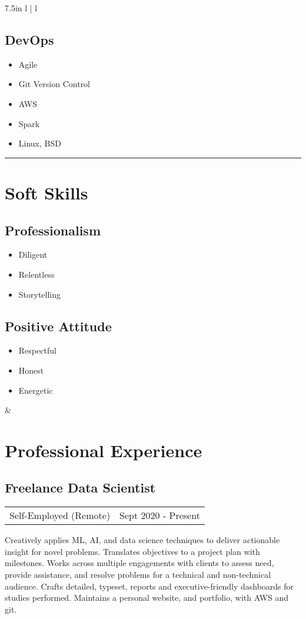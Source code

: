 \documentclass{article}
\begin{document}
\begin{tabular*}{7.5in}{ l | l}
\begin{minipage}[t]{2.0in}
	\subsection*{DevOps}
	\begin{itemize}[noitemsep]
		\item Agile
		\item Git Version Control
		\item AWS
		\item Spark
		\item Linux, BSD
	\end{itemize}
	\hrule
	\section*{Soft Skills}
	\subsection*{Professionalism}
	\begin{itemize}[noitemsep]
		\item Diligent
		\item Relentless
		\item Storytelling
	\end{itemize}
	\subsection*{Positive Attitude}
	\begin{itemize}[noitemsep]
		\item Respectful
		\item Honest
		\item Energetic
	\end{itemize}
	\smallskip
	\end{minipage} &
	
	\begin{minipage}[t]{5.25in}
	\section*{Professional Experience}
	\subsection*{Freelance Data Scientist}
	\begin{tabular*}{\columnwidth}{@{\extracolsep{\fill}}lr}
		Self-Employed (Remote) & Sept 2020 - Present
	\end{tabular*}
	Creatively applies ML, AI, and data science techniques to deliver actionable insight for novel problems.
	Translates objectives to a project plan with milestones.
	Works across multiple engagements with clients to assess need, provide assistance, and resolve problems for a technical and non-technical audience.
	Crafts detailed, typeset, reports and executive-friendly dashboards for studies performed.
	Maintains a personal website, and portfolio, with AWS and git.
	\medskip

\end{minipage}
\end{tabular*}
\end{document}
